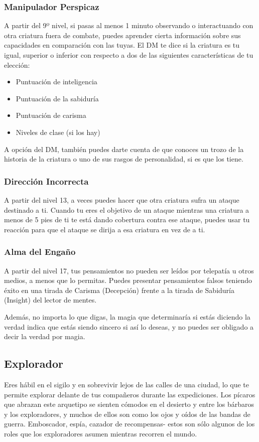 \documentclass[a4paper,twocolumn,openany,10pt]{dndbook}
\begin{document}
\subsubsection{Manipulador Perspicaz}
A partir del 9º nivel, si pasas al menos 1 minuto observando o interactuando con otra criatura fuera de combate, puedes aprender
cierta información sobre sus capacidades en comparación con las tuyas. El DM te dice si la criatura es tu igual, superior o
inferior con respecto a dos de las siguientes características de tu elección:
\begin{itemize}
\item Puntuación de inteligencia
\item Puntuación de la sabiduría
\item Puntuación de carisma
\item Niveles de clase (si los hay)
\end{itemize}
A opción del DM, también puedes darte cuenta de que conoces un trozo de la historia de la criatura o uno de sus rasgos de
personalidad, si es que los tiene.

\subsubsection{Dirección Incorrecta}
A partir del nivel 13, a veces puedes hacer que otra criatura sufra un ataque destinado a ti. Cuando tu eres el objetivo de un
ataque mientras una criatura a menos de 5 pies de ti te está dando cobertura contra ese ataque, puedes usar tu reacción para que
el ataque se dirija a esa criatura en vez de a ti. 

\subsubsection{Alma del Engaño}
A partir del nivel 17, tus pensamientos no pueden ser leídos por telepatía u otros medios, a menos que lo permitas. Puedes
presentar pensamientos falsos teniendo éxito en una tirada de Carisma (Decepción) frente a la tirada de Sabiduría (Insight) del
lector de mentes.

Además, no importa lo que digas, la magia que determinaría si estás diciendo la verdad indica que estás siendo sincero si así lo
deseas, y no puedes ser obligado a decir la verdad por magia. 

\subsection{Explorador}
Eres hábil en el sigilo y en sobrevivir lejos de las calles de una ciudad, lo que te permite explorar delante de tus compañeros
durante las expediciones. Los pícaros que abrazan este arquetipo se sienten cómodos en el desierto y entre los bárbaros y los
exploradores, y muchos de ellos son como los ojos y oídos de las bandas de guerra. Emboscador, espía, cazador de recompensas-
estos son sólo algunos de los roles que los exploradores asumen mientras recorren el mundo.
\end{document}
